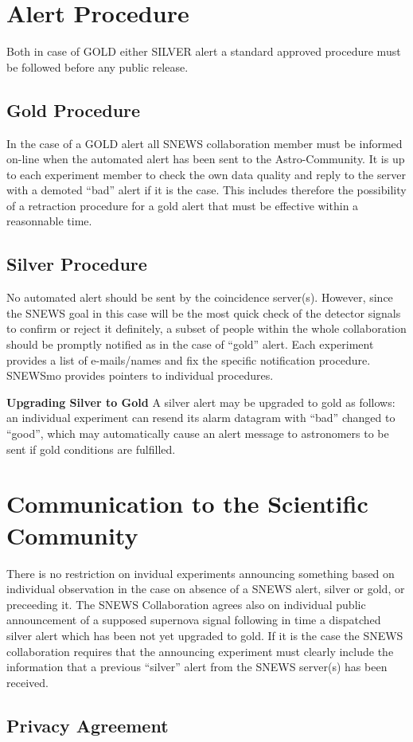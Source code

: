 \documentclass{article}
\begin{document}
\section{Alert Procedure}
Both in case of GOLD either SILVER alert a standard approved procedure must 
be followed before any public release. 

\subsection{Gold Procedure}
In the case of a GOLD alert all SNEWS collaboration member must be informed
on-line when the automated alert has been sent to the Astro-Community. It is
up to each experiment member to check the own data quality and reply to the 
server with a demoted ``bad'' alert if it is the case.
This includes therefore the possibility of a retraction procedure for a gold 
alert that must be effective within a reasonnable time.

\subsection{Silver Procedure}
No automated alert should be sent by the coincidence server(s). However,
since the SNEWS goal in this case will be the most quick check of the detector signals to confirm or reject it definitely,
a subset of people within the whole collaboration should be promptly notified
as in the case of ``gold'' alert. 
Each experiment provides a list of e-mails/names and fix the
specific notification procedure. SNEWSmo provides pointers to individual procedures. 

\textbf{Upgrading Silver to Gold}
A silver alert may be upgraded to gold as follows:  an
individual experiment can resend its alarm datagram with ``bad''
changed to ``good'', which may automatically cause an alert message to
astronomers to be sent if gold conditions are fulfilled.  

\section{Communication to the Scientific Community}
There is no restriction on invidual experiments announcing
something based on individual observation in the case on absence
of a SNEWS alert, silver or gold, or preceeding it.
The SNEWS Collaboration agrees also on individual public announcement of a 
supposed supernova signal following in time a dispatched silver alert
which has been not  yet upgraded to gold. If it is the case the SNEWS 
collaboration requires that the announcing experiment must clearly include the 
information that a previous ``silver'' alert from the SNEWS server(s) has been 
received.
                                         
\subsection{Privacy Agreement}
                                     
\end{document}

